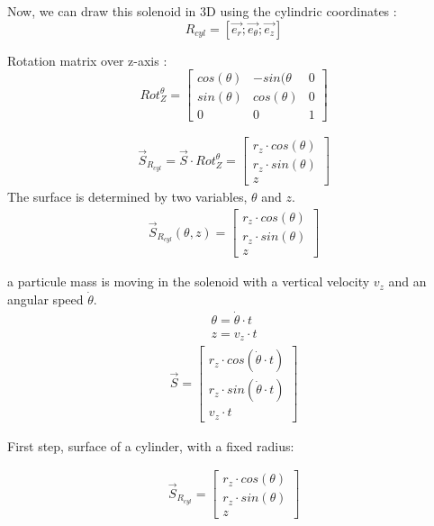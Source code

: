 \documentclass[12pt,a4paper]{article}
\begin{document}
Now, we can draw this solenoid in 3D using the cylindric coordinates : 
\begin{equation}
R_{cyl}=[\vec{e_r};\vec{e_{\theta}};\vec{e_z}]
\end{equation}

Rotation matrix over z-axis : 
\begin{equation}
Rot_Z^{\theta}=
\begin{bmatrix}
cos(\theta) & -sin(\theta & 0\\
sin(\theta) & cos(\theta) & 0\\
0 & 0 & 1
\end{bmatrix}
\end{equation}

\begin{eqnarray}
\vec{S}_{R_{cyl}}=\vec{S}\cdot Rot_Z^{\theta}=\begin{bmatrix}
r_z \cdot cos(\theta) \\
r_z \cdot sin(\theta) \\
z
\end{bmatrix}
\end{eqnarray}
The surface is determined by two variables, $\theta$ and $z$.
\begin{eqnarray}
\vec{S}_{R_{cyl}}(\theta,z)=\begin{bmatrix}
r_z \cdot cos(\theta) \\
r_z \cdot sin(\theta) \\
z
\end{bmatrix}
\end{eqnarray}



a particule mass is moving in the solenoid with a vertical velocity $v_z$ and an angular speed $\dot{\theta}$.
\begin{eqnarray}
\theta = \dot{\theta} \cdot t\\
z = v_z \cdot t
\end{eqnarray}
\begin{eqnarray}
\vec{S}=\begin{bmatrix}
r_z \cdot cos(\dot{\theta} \cdot t) \\
r_z \cdot sin(\dot{\theta} \cdot t) \\
v_z \cdot t
\end{bmatrix}
\end{eqnarray}




First step, surface of a cylinder, with a fixed radius: 

\begin{eqnarray}
\vec{S}_{R_{cyl}}=\begin{bmatrix}
r_z \cdot cos(\theta) \\
r_z \cdot sin(\theta) \\
z
\end{bmatrix}
\end{eqnarray}
\newpage
\end{document}
